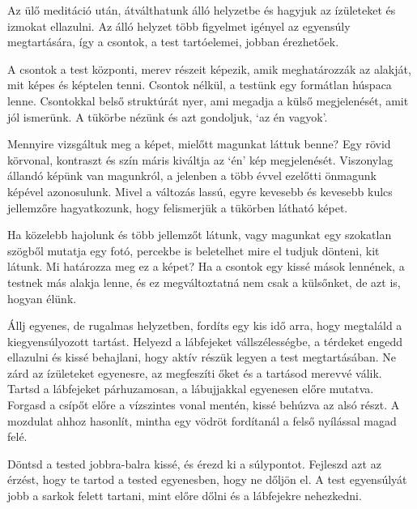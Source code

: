 
Az ülő meditáció után, átválthatunk álló helyzetbe és hagyjuk az
ízületeket és izmokat ellazulni. Az álló helyzet több figyelmet igényel
az egyensúly megtartására, így a csontok, a test tartóelemei, jobban
érezhetőek.

A csontok a test központi, merev részeit képezik, amik meghatározzák az
alakját, mit képes és képtelen tenni. Csontok nélkül, a testünk egy
formátlan húspaca lenne. Csontokkal belső struktúrát nyer, ami megadja a
külső megjelenését, amit jól ismerünk. A tükörbe nézünk és azt
gondoljuk, `az én vagyok'.

\clearpage
\thispagestyle{empty}\mbox{}
\clearpage

Mennyire vizsgáltuk meg a képet, mielőtt magunkat láttuk benne? Egy
rövid körvonal, kontraszt és szín máris kiváltja az `én' kép
megjelenését. Viszonylag állandó képünk van magunkról, a jelenben a több
évvel ezelőtti önmagunk képével azonosulunk. Mivel a változás lassú,
egyre kevesebb és kevesebb kulcs jellemzőre hagyatkozunk, hogy
felismerjük a tükörben látható képet.

Ha közelebb hajolunk és több jellemzőt látunk, vagy magunkat egy
szokatlan szögből mutatja egy fotó, percekbe is beletelhet mire el
tudjuk dönteni, kit látunk. Mi határozza meg ez a képet? Ha a csontok
egy kissé mások lennének, a testnek más alakja lenne, és ez
megváltoztatná nem csak a külsőnket, de azt is, hogyan élünk.


Állj egyenes, de rugalmas helyzetben, fordíts egy kis idő arra, hogy
megtaláld a kiegyensúlyozott tartást. Helyezd a lábfejeket
vállszélességbe, a térdeket engedd ellazulni és kissé behajlani, hogy
aktív részük legyen a test megtartásában. Ne zárd az ízületeket
egyenesre, az megfeszíti őket és a tartásod merevvé válik. Tartsd a
lábfejeket párhuzamosan, a lábujjakkal egyenesen előre mutatva. Forgasd
a csípőt előre a vízszintes vonal mentén, kissé behúzva az alsó részt. A
mozdulat ahhoz hasonlít, mintha egy vödröt fordítanál a felső nyílással
magad felé.

Döntsd a tested jobbra-balra kissé, és érezd ki a súlypontot. Fejleszd
azt az érzést, hogy te tartod a tested egyenesben, hogy ne dőljön el. A
test egyensúlyát jobb a sarkok felett tartani, mint előre dőlni és a
lábfejekre nehezkedni.

